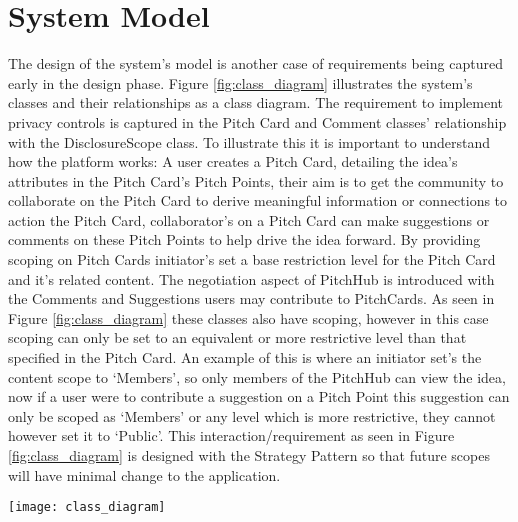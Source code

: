 \section{System Model}

The design of the system's model is another case of requirements being captured early in the design phase. Figure \ref{fig:class_diagram} illustrates the system's classes and their relationships as a class diagram. The requirement to implement privacy controls is captured in the Pitch Card and Comment classes' relationship with the DisclosureScope class. To illustrate this it is important to understand how the platform works: A user creates a Pitch Card, detailing the idea's attributes in the Pitch Card's Pitch Points, their aim is to get the community to collaborate on the Pitch Card to derive meaningful information or connections to action the Pitch Card, collaborator's on a Pitch Card can make suggestions or comments on these Pitch Points to help drive the idea forward. By providing scoping on Pitch Cards initiator's set a base restriction level for the Pitch Card and it's related content. The negotiation aspect of PitchHub is introduced with the Comments and Suggestions users may contribute to PitchCards. As seen in Figure \ref{fig:class_diagram} these classes also have scoping, however in this case scoping can only be set to an equivalent or more restrictive level than that specified in the Pitch Card. An example of this is where an initiator set's the content scope to `Members', so only members of the PitchHub can view the idea, now if a user were to contribute a suggestion on a Pitch Point this suggestion can only be scoped as `Members' or any level which is more restrictive, they cannot however set it to `Public'. This interaction/requirement as seen in Figure \ref{fig:class_diagram} is designed with the Strategy Pattern so that future scopes will have minimal change to the application.
 
\begin{sidewaysfigure}[ht]
    \centering
    \texttt{[image: class\_diagram]}
    \caption{PitchHub's system structure as represented in a class diagram. Of note is the Pitch Card and Comment classes and their relationship to the DisclosureScopes. This relationship describes the Pitch Card and Comment classes ability to scope the visibility of their content. (NB: Some attributes were left out for the sake of brevity e.g. Pitch Cards have an `images' attribute)}
    \label{fig:class_diagram}
\end{sidewaysfigure}

